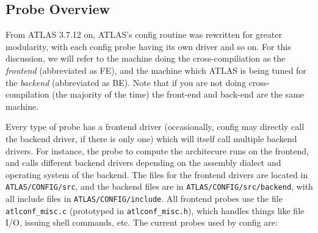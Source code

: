 \documentclass[11pt]{article}
\begin{document}
\subsection{Probe Overview}
From ATLAS 3.7.12 on, ATLAS's config routine was rewritten for greater
modularity, with each config probe having its own driver and so on.
For this discussion, we will refer to the machine doing the cross-compiliation
as the {\it frontend} (abbreviated as FE), and the machine which ATLAS is
being tuned for the {\it backend} (abbreviated as BE).  Note that if you are
not doing cross-compilation (the majority of the time) the front-end and
back-end are the same machine.

Every type of probe has a frontend driver (occasionally, config may directly
call the backend driver, if there is only one) which will itself call
multiple backend drivers.  
For instance, the probe to compute the architecure runs on the frontend, and
calls different backend drivers depending on the assembly dialect and operating
system of the backend.
The files for the frontend drivers are located in
{\tt ATLAS/CONFIG/src}, and the backend files are in 
{\tt ATLAS/CONFIG/src/backend}, with all include files in 
{\tt ATLAS/CONFIG/include}.  All frontend probes use the file 
{\tt atlconf\_misc.c} (prototyped in {\tt atlconf\_misc.h}), 
which handles things like file I/O, issuing shell commands, etc.  
The current probes used by config are:
\end{document}
